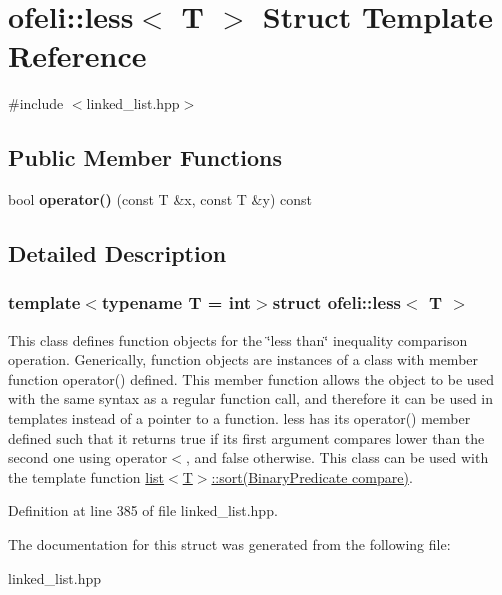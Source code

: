 \hypertarget{structofeli_1_1less}{\section{ofeli\-:\-:less$<$ T $>$ Struct Template Reference}
\label{structofeli_1_1less}
}


{\ttfamily \#include $<$linked\-\_\-list.\-hpp$>$}

\subsection*{Public Member Functions}
\begin{DoxyCompactItemize}
\item 
\hypertarget{structofeli_1_1less_a4afc25c0817a8118a6222052c45bd597}{bool {\bfseries operator()} (const T \&x, const T \&y) const }\label{structofeli_1_1less_a4afc25c0817a8118a6222052c45bd597}

\end{DoxyCompactItemize}


\subsection{Detailed Description}
\subsubsection*{template$<$typename T = int$>$struct ofeli\-::less$<$ T $>$}

This class defines function objects for the \char`\"{}less than\char`\"{} inequality comparison operation. Generically, function objects are instances of a class with member function {\ttfamily operator()} defined. This member function allows the object to be used with the same syntax as a regular function call, and therefore it can be used in templates instead of a pointer to a function. {\ttfamily less} has its {\ttfamily operator()} member defined such that it returns {\ttfamily true} if its first argument compares lower than the second one using {\ttfamily operator$<$}, and {\ttfamily false} otherwise. This class can be used with the template function {\ttfamily \hyperlink{classofeli_1_1list_aaeedac18b70d233644d84c7ad3a9a3fa}{list$<$\-T$>$\-::sort(\-Binary\-Predicate compare)}}. 

Definition at line 385 of file linked\-\_\-list.\-hpp.



The documentation for this struct was generated from the following file\-:\begin{DoxyCompactItemize}
\item 
linked\-\_\-list.\-hpp\end{DoxyCompactItemize}
